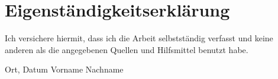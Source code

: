 \chapter*{Eigenständigkeitserklärung} %
Ich versichere hiermit, dass ich die Arbeit selbstständig verfasst und keine anderen als die angegebenen Quellen und Hilfsmittel benutzt habe.
\vspace{4cm}

\hspace{2cm} Ort, Datum
\hfill Vorname Nachname
\hspace{2cm} 
